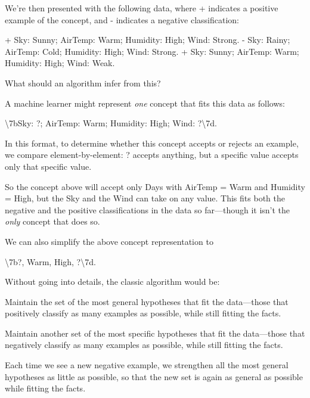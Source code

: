 \bigskip

{
 We're then presented with the following data,
where + indicates a positive example of the concept, and - indicates a
negative classification:}

{\centering
 + Sky: Sunny; AirTemp: Warm; Humidity: High; Wind: Strong.\newline
 - Sky: Rainy; AirTemp: Cold; Humidity: High; Wind: Strong.\newline
 + Sky: Sunny; AirTemp: Warm; Humidity: High; Wind: Weak.
\par}


\bigskip

{
 What should an algorithm infer from this?}

{
 A machine learner might represent \textit{one} concept that fits
this data as follows:}

{\centering
 {\textbackslash}{\textquotesingle}7bSky: ?; AirTemp: Warm;
Humidity: High; Wind: ?{\textbackslash}{\textquotesingle}7d.
\par}


\bigskip

{
 In this format, to determine whether this concept accepts or
rejects an example, we compare element-by-element: ? accepts anything,
but a specific value accepts only that specific value.}

{
 So the concept above will accept only Days with AirTemp = Warm and
Humidity = High, but the Sky and the Wind can take on any value. This
fits both the negative and the positive classifications in the data so
far---though it isn't the \textit{only} concept that
does so.}

{
 We can also simplify the above concept representation to}

{\centering
 {\textbackslash}{\textquotesingle}7b?, Warm, High,
?{\textbackslash}{\textquotesingle}7d.
\par}


\bigskip

{
 Without going into details, the classic algorithm would be:}

{
 Maintain the set of the most general hypotheses that fit the
data---those that positively classify as many examples as possible,
while still fitting the facts.}

{
 Maintain another set of the most specific hypotheses that fit the
data---those that negatively classify as many examples as possible,
while still fitting the facts.}

{
 Each time we see a new negative example, we strengthen all the
most general hypotheses as little as possible, so that the new set is
again as general as possible while fitting the facts.}

